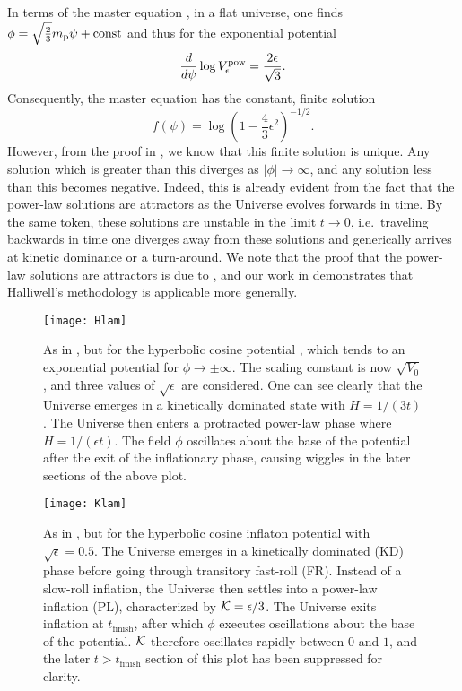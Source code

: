 In terms of the master equation , in a flat
universe, one finds $\phi = \sqrt{\frac{2}{3}}m_{\mathrm{p}} \psi + \mathrm{const}
$ and thus for the exponential potential  
%
\begin{equation}
  \frac{d}{d\psi} \log V^\mathrm{pow}_\epsilon = \frac{2\epsilon}{\sqrt{3}}. 
\end{equation}
%
Consequently, the master equation has the constant, finite solution
%
\begin{equation}
  f(\psi) = \log\left(1-\frac{4}{3}\epsilon^2\right)^{-1/2}.
  \label{eqn:uf_power_law}
\end{equation}
%
However, from the proof in
, we know that this
finite solution is unique. Any solution which is greater than this
diverges as $|\phi|\to\infty$, and any solution less than this becomes
negative.  Indeed, this is already evident from the fact that the
power-law solutions are attractors as the Universe evolves forwards in
time. By the same token, these solutions are unstable in the limit $t
\to 0$, i.e.\ traveling backwards in time one diverges away from
these solutions and generically arrives at kinetic dominance or a
turn-around.  We note that the proof that the power-law solutions are
attractors is due to \citet{halliwell_scalar_1987}, and our work in
 demonstrates that
Halliwell's methodology is applicable more generally.

%
\begin{figure}
  \texttt{[image: Hlam]}
  \caption{As in \protect{}, but for the
  hyperbolic cosine potential \protect{}, which tends
  to an exponential potential for $\phi \to \pm\infty$. The scaling
  constant is now $\sqrt{V_0}$, and three values of $\sqrt{\epsilon}$
  are considered. One can see clearly that the Universe emerges in a
  kinetically dominated state with $H=1/(3t)$. The Universe then
  enters a protracted power-law phase where $H = 1/(\epsilon t)$. The
  field $\phi$ oscillates about the base of the potential after the
  exit of the inflationary phase, causing wiggles in the later
  sections of the above plot.  }
  \label{fig:figure_Hlam}
\end{figure}
%

%
\begin{figure}
  \texttt{[image: Klam]}
  \caption{As in \protect{}, but for the
  hyperbolic cosine inflaton potential with $\sqrt{\epsilon}=0.5$. The
  Universe emerges in a kinetically dominated (KD) phase before going
  through transitory fast-roll (FR). Instead of a slow-roll inflation,
  the Universe then settles into a power-law inflation (PL),
  characterized by $\mathcal{K}=\epsilon/3$. The Universe exits inflation
  at $t_\mathrm{finish}$, after which $\phi$ executes oscillations
  about the base of the potential. $\mathcal{K}$ therefore oscillates
  rapidly between $0$ and $1$, and the later $t>t_\mathrm{finish}$
  section of this plot has been suppressed for clarity.  }
  \label{fig:figure_Klam}
\end{figure}
%

